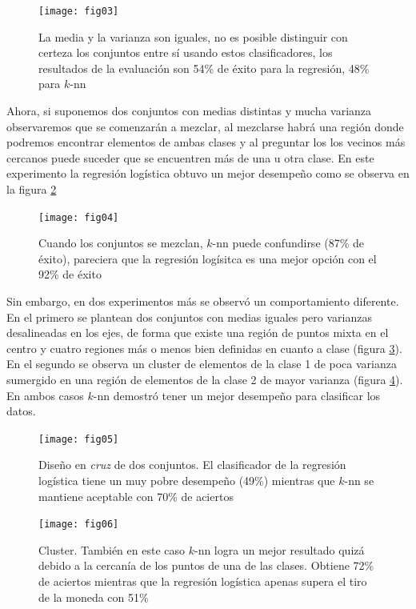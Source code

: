 \documentclass[11pt,letterpaper,reqno]{article}
\begin{document}
\begin{figure}[h]
	\begin{center}
		\texttt{[image: fig03]}
	\end{center}
	\caption{La media y la varianza son iguales, no es posible distinguir con certeza los conjuntos entre sí usando estos clasificadores, los resultados de la evaluación son 54\% de éxito para la regresión, 48\% para $k$-nn}
	\label{fig:fig03}
\end{figure}

Ahora, si suponemos dos conjuntos con medias distintas y mucha varianza observaremos que se comenzarán a mezclar, al mezclarse habrá una región donde podremos encontrar elementos de ambas clases y al preguntar los los vecinos más cercanos puede suceder que se encuentren más de una u otra clase. En este experimento la regresión logística obtuvo un mejor desempeño como se observa en la figura \ref{fig:fig04}

\begin{figure}[h]
	\begin{center}
		\texttt{[image: fig04]}
	\end{center}
	\caption{Cuando los conjuntos se mezclan, $k$-nn puede confundirse (87\% de éxito), pareciera que la regresión logísitca es una mejor opción con el 92\% de éxito}
	\label{fig:fig04}
\end{figure}

Sin embargo, en dos experimentos más se observó un comportamiento diferente. En el primero se plantean dos conjuntos con medias iguales pero varianzas desalineadas en los ejes, de forma que existe una región de puntos mixta en el centro y cuatro regiones más o menos bien definidas en cuanto a clase (figura \ref{fig:fig05}). En el segundo se observa un cluster de elementos de la clase 1 de poca varianza sumergido en una región de elementos de la clase 2 de mayor varianza (figura \ref{fig:fig06}). En ambos casos $k$-nn demostró tener un mejor desempeño para clasificar los datos.

\begin{figure}[h]
	\begin{center}
		\texttt{[image: fig05]}
	\end{center}
	\caption{Diseño en \textit{cruz} de dos conjuntos. El clasificador de la regresión logística tiene un muy pobre desempeño (49\%) mientras que $k$-nn se mantiene aceptable con 70\% de aciertos}
	\label{fig:fig05}
\end{figure}

\begin{figure}[h]
	\begin{center}
		\texttt{[image: fig06]}
	\end{center}
	\caption{Cluster. También en este caso $k$-nn logra un mejor resultado quizá debido a la cercanía de los puntos de una de las clases. Obtiene 72\% de aciertos mientras que la regresión logística apenas supera el tiro de la moneda con 51\%}
	\label{fig:fig06}
\end{figure}
\end{document}
